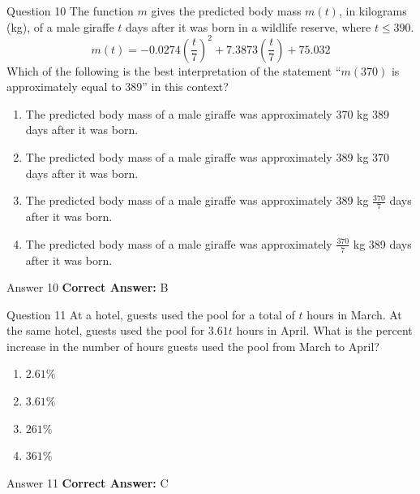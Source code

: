 \documentclass{beamer}
\begin{document}
\begin{frame}{Question 10}
\small
The function $m$ gives the predicted body mass $m(t)$, in kilograms (kg), of a male giraffe $t$ days after it was born in a wildlife reserve, where $t \leq 390$.  
\[
m(t) = -0.0274\left(\frac{t}{7}\right)^2 + 7.3873\left(\frac{t}{7}\right) + 75.032
\]  
Which of the following is the best interpretation of the statement “$m(370)$ is approximately equal to $389$” in this context?
\vspace{0.35cm}
\begin{enumerate}
    \item[A.] The predicted body mass of a male giraffe was approximately 370 kg 389 days after it was born.
    \item[B.] The predicted body mass of a male giraffe was approximately 389 kg 370 days after it was born.
    \item[C.] The predicted body mass of a male giraffe was approximately 389 kg $\frac{370}{7}$ days after it was born.
    \item[D.] The predicted body mass of a male giraffe was approximately $\frac{370}{7}$ kg 389 days after it was born.
\end{enumerate}
\end{frame}
\begin{frame}{Answer 10}
\small
\textbf{Correct Answer:} B
\end{frame}

\begin{frame}{Question 11}
\small
At a hotel, guests used the pool for a total of $t$ hours in March. At the same hotel, guests used the pool for $3.61t$ hours in April.  
What is the percent increase in the number of hours guests used the pool from March to April?
\vspace{0.35cm}
\begin{enumerate}
    \item[A.] $2.61\%$
    \item[B.] $3.61\%$
    \item[C.] $261\%$
    \item[D.] $361\%$
\end{enumerate}
\end{frame}
\begin{frame}{Answer 11}
\small
\textbf{Correct Answer:} C
\end{frame}
\end{document}
